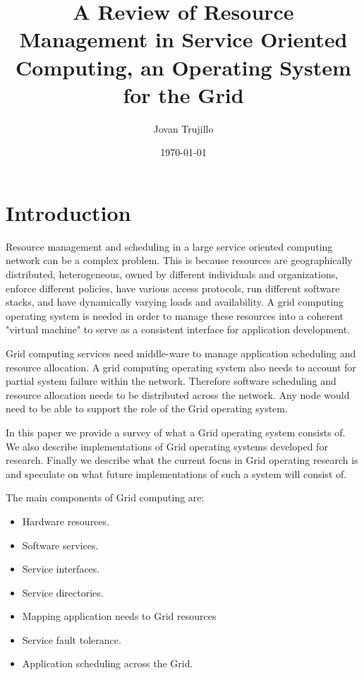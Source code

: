 \documentclass{article}
\title{A Review of Resource Management in Service Oriented Computing, an Operating System for the Grid}
\author{Jovan Trujillo}
\date{\today}
\begin{document}
\maketitle

\section{Introduction}
Resource management and scheduling in a large service oriented computing network can be a complex problem. This is because resources are geographically distributed, heterogeneous, owned by different individuals and organizations, enforce different policies, have various access protocols, run different software stacks, and have dynamically varying loads and availability.\citep{economygrid} A grid computing operating system is needed in order to manage these resources into a coherent "virtual machine" to serve as a consistent interface for application development. 


Grid computing services need middle-ware to manage application scheduling and resource allocation. A grid computing operating system also needs to account for partial system failure within the network. Therefore software scheduling and resource allocation needs to be distributed across the network. Any node would need to be able to support the role of the Grid operating system. 

In this paper we provide a survey of what a Grid operating system consists of. We also describe implementations of Grid operating systems developed for research. Finally we describe what the current focus in Grid operating research is and speculate on what future implementations of such a system will consist of.  


The main components of Grid computing are:
\begin{itemize}
\item Hardware resources.
\item Software services.
\item Service interfaces.
\item Service directories.
\item Mapping application needs to Grid resources 
\item Service fault tolerance.
\item Application scheduling across the Grid.
\end{itemize}
\end{document}
